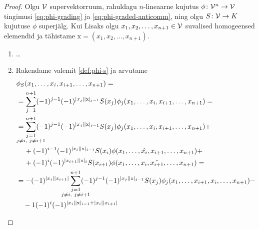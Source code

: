 \begin{proof}
    Olgu $\mathcal{V}$ supervektorruum, rahuldagu $n$-lineaarne
    kujutus $\phi \colon \mathcal{V}^n \to \mathcal{V}$ tingimusi
    \eqref{eq:phi-grading} ja \eqref{eq:phi-graded-anticomm}, ning
    olgu $S \colon \mathcal{V} \to K$ kujutuse $\phi$ superjälg. Kui
    Lisaks olgu $x_1, x_2, \dots, x_{n+1} \in \mathcal{V}$ suvalised
    homogeensed elemendid ja tähistame
    $\mathrm{x} = (x_1, x_2, \dots, x_{n+1})$.
    \begin{enumerate}[label=\arabic*)]
        \item \dots

        \item Rakendame valemit \eqref{def:phi-s} ja arvutame
            \begin{align*}
                &\phi_S(x_1, \dots, x_i, x_{i+1}, \dots, x_{n+1}) = \\
                &= \sum_{j=1}^{n+1}
                    (-1)^{j-1} (-1)^{|x_j||\mathrm{x}|_{j-1}}
                    S(x_j) \phi_j(
                        x_1, \dots, x_i, x_{i+1}, \dots, x_{n+1}
                    ) = \\
                &= \sum_{\mathclap{
                        \substack{j=1\\j \ne i,\ j \ne i+1}}
                    }^{n+1}
                    (-1)^{j-1} (-1)^{|x_j||\mathrm{x}|_{j-1}}
                    S(x_j) \phi_j(
                        x_1, \dots, x_i, x_{i+1}, \dots, x_{n+1}
                    ) + \\
                &\quad\, +
                    (-1)^{i-1} (-1)^{|x_i||\mathrm{x}|_{i-1}}
                    S(x_i) \phi(
                        x_1, \dots, \hat{x_i}, x_{i+1}, \dots, x_{n+1}
                    ) + \\
                &\quad\, +
                    (-1)^{i} (-1)^{|x_{i+1}||\mathrm{x}|_{i}}
                    S(x_{i+1}) \phi(
                        x_1, \dots, x_i, \hat{x_{i+1}}, \dots, x_{n+1}
                    ) = \\
                &= -(-1)^{|x_i||x_{i+1}|} \sum_{\mathclap{
                        \substack{j=1\\j \ne i,\ j \ne i+1}}
                    }^{n+1}
                    (-1)^{j-1} (-1)^{|x_j||\mathrm{x}|_{j-1}}
                    S(x_j) \phi_j(
                        x_1, \dots, x_{i+1}, x_i, \dots, x_{n+1}
                    ) - \\
                &\quad
                    -1(-1)^i (-1)^{
                        |x_i||\mathrm{x}|_{i-1} + |x_i||x_{i+1}|
}
\end{align*}
\end{enumerate}
\end{proof}
